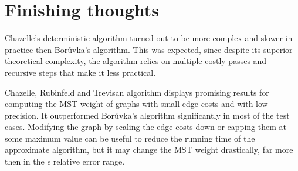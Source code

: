 \section{Finishing thoughts}

Chazelle's deterministic algorithm turned out to be more complex and slower in practice then Borůvka's algorithm. This was expected, since despite its superior theoretical complexity, the algorithm relies on multiple costly passes and recursive steps that make it less practical.

Chazelle, Rubinfeld and Trevisan algorithm displays promising results for computing the MST weight of graphs with small edge costs and with low precision. It outperformed Borůvka's algorithm significantly in most of the test cases. Modifying the graph by scaling the edge costs down or capping them at some maximum value can be useful to reduce the running time of the approximate algorithm, but it may change the MST weight drastically, far more then in the $\epsilon$ relative error range.
